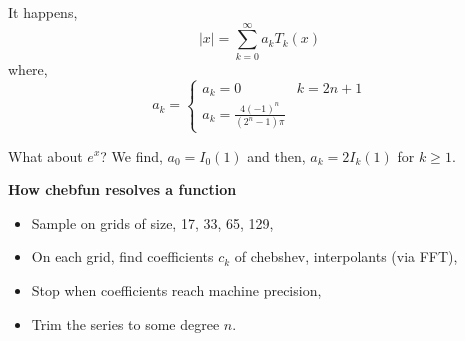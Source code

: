 \begin{eg}[Exercise 3.6]
  It happens,
  $$ |x| = \sum_{k=0}^\infty a_kT_k(x)$$
  where,
  $$ a_k = \begin{cases}
    a_k = 0 & k = 2n+1\\
    a_k = \frac{4(-1)^n}{(2^n - 1)\pi }
  \end{cases} $$
\end{eg}

\begin{eg}[Exercise 3.15]
  What about $e^x$? We find, $a_0 = I_0(1)$ and then, $a_k = 2I_k(1)$ for $k \ge 1$.
\end{eg}

\textbf{How chebfun resolves a function}
\begin{itemize}
  \item Sample on grids of size, 17, 33, 65, 129,
  \item On each grid, find coefficients $c_k$ of chebshev, interpolants (via FFT),
  \item Stop when coefficients reach machine precision,
  \item Trim the series to some degree $n$.
\end{itemize}